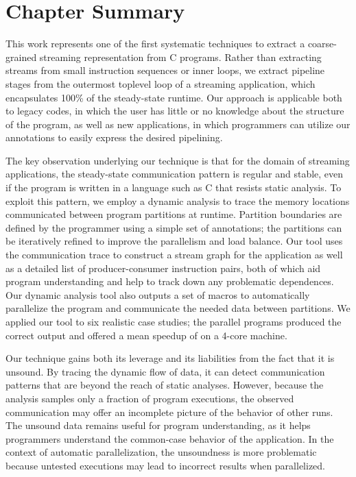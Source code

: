 \section{Chapter Summary}
\label{sec:conclusions}

This work represents one of the first systematic techniques to extract
a coarse-grained streaming representation from C programs.  Rather
than extracting streams from small instruction sequences or inner
loops, we extract pipeline stages from the outermost toplevel loop of
a streaming application, which encapsulates 100\% of the steady-state
runtime.  Our approach is applicable both to legacy codes, in which
the user has little or no knowledge about the structure of the
program, as well as new applications, in which programmers can utilize
our annotations to easily express the desired pipelining.

The key observation underlying our technique is that for the domain of
streaming applications, the steady-state communication pattern is
regular and stable, even if the program is written in a language such
as C that resists static analysis.  To exploit this pattern, we employ
a dynamic analysis to trace the memory locations communicated between
program partitions at runtime.  Partition boundaries are defined by
the programmer using a simple set of annotations; the partitions can
be iteratively refined to improve the parallelism and load balance.
Our tool uses the communication trace to construct a stream graph for
the application as well as a detailed list of producer-consumer
instruction pairs, both of which aid program understanding and help to
track down any problematic dependences.  Our dynamic analysis tool
also outputs a set of macros to automatically parallelize the program
and communicate the needed data between partitions.  We applied our
tool to six realistic case studies; the parallel programs produced the
correct output and offered a mean speedup of {\meanspeedup} on a
4-core machine.

Our technique gains both its leverage and its liabilities from the
fact that it is unsound.  By tracing the dynamic flow of data, it can
detect communication patterns that are beyond the reach of static
analyses.  However, because the analysis samples only a fraction of
program executions, the observed communication may offer an incomplete
picture of the behavior of other runs.  The unsound data remains
useful for program understanding, as it helps programmers understand
the common-case behavior of the application.  In the context of
automatic parallelization, the unsoundness is more problematic because
untested executions may lead to incorrect results when parallelized.

